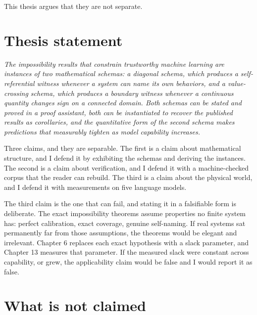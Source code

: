 \documentclass{memoir}
\begin{document}
This thesis argues that they are not separate.



\section{Thesis statement}\label{Two--Schemas--of--Impossibility-005F-005F-005F--Machine--Checked--Limits--of--Trustworthy--Machine--Learning-005F-005F-005F--and--Why--They--Tighten--with--Capability----Introduction----Thesis--statement}

\emph{The impossibility results that constrain trustworthy machine learning are
instances of two mathematical schemas: a diagonal schema, which produces a
self-referential witness whenever a system can name its own behaviors, and a
value-crossing schema, which produces a boundary witness whenever a continuous
quantity changes sign on a connected domain. Both schemas can be stated and
proved in a proof assistant, both can be instantiated to recover the published
results as corollaries, and the quantitative form of the second schema makes
predictions that measurably tighten as model capability increases.}

Three claims, and they are separable. The first is a claim about mathematical
structure, and I defend it by exhibiting the schemas and deriving the
instances. The second is a claim about verification, and I defend it with a
machine-checked corpus that the reader can rebuild. The third is a claim about
the physical world, and I defend it with measurements on five language models.

The third claim is the one that can fail, and stating it in a falsifiable form
is deliberate. The exact impossibility theorems assume properties no finite
system has: perfect calibration, exact coverage, genuine self-naming. If real
systems sat permanently far from those assumptions, the theorems would be
elegant and irrelevant. Chapter 6 replaces each exact hypothesis with a slack
parameter, and Chapter 13 measures that parameter. If the measured slack were
constant across capability, or grew, the applicability claim would be false and
I would report it as false.



\section{What is not claimed}\label{Two--Schemas--of--Impossibility-005F-005F-005F--Machine--Checked--Limits--of--Trustworthy--Machine--Learning-005F-005F-005F--and--Why--They--Tighten--with--Capability----Introduction----What--is--not--claimed}
\end{document}
